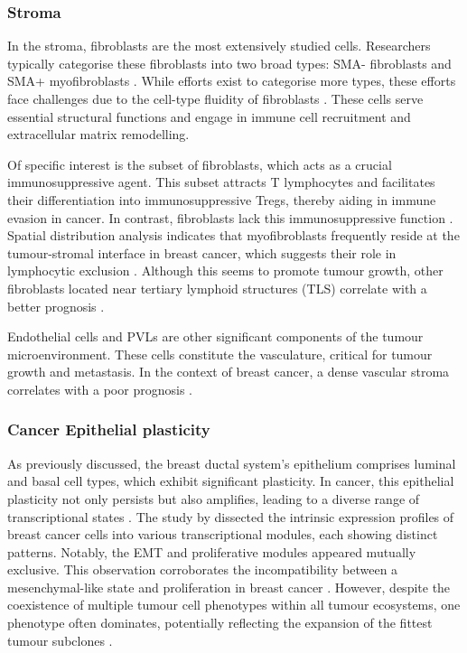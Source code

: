 \subsubsection*{Stroma}

In the stroma, fibroblasts are the most extensively studied cells. Researchers typically categorise these fibroblasts into two broad types: SMA- fibroblasts and SMA+ myofibroblasts \parencite{Costa2018-ir}. While efforts exist to categorise more types, these efforts face challenges due to the cell-type fluidity of fibroblasts \parencite{Cords2023-og,Wu2021-uq}. These cells serve essential structural functions and engage in immune cell recruitment and extracellular matrix remodelling.

Of specific interest is the   subset of fibroblasts, which acts as a crucial immunosuppressive agent. This subset attracts T lymphocytes and facilitates their differentiation into immunosuppressive Tregs, thereby aiding in immune evasion in cancer. In contrast,   fibroblasts lack this immunosuppressive function \parencite{Costa2018-ir}. Spatial distribution analysis indicates that myofibroblasts frequently reside at the tumour-stromal interface in breast cancer, which suggests their role in lymphocytic exclusion \parencite{Danenberg2022-zb}. Although this seems to promote tumour growth, other fibroblasts located near tertiary lymphoid structures (TLS) correlate with a better prognosis \parencite{Danenberg2022-zb, Cords2023-og} .

Endothelial cells and \acp{PVL} are other significant components of the tumour microenvironment. These cells constitute the vasculature, critical for tumour growth and metastasis. In the context of breast cancer, a dense vascular stroma correlates with a poor prognosis \parencite{Danenberg2022-zb}.

\subsubsection*{Cancer Epithelial plasticity}

As previously discussed, the breast ductal system's epithelium comprises luminal and basal cell types, which exhibit significant plasticity. In cancer, this epithelial plasticity not only persists but also amplifies, leading to a diverse range of transcriptional states \parencite{Wagner2019-zp, Wu2021-uq, Pal2021-rf}. The study by \textcite{Wu2021-uq} dissected the intrinsic expression profiles of breast cancer cells into various transcriptional modules, each showing distinct patterns. Notably, the \acf{EMT} and proliferative modules appeared mutually exclusive. This observation corroborates the incompatibility between a mesenchymal-like state and proliferation in breast cancer \parencite{Tsai2012-hb}. However, despite the coexistence of multiple tumour cell phenotypes within all tumour ecosystems, one phenotype often dominates, potentially reflecting the expansion of the fittest tumour subclones \parencite{Wagner2019-zp}.

